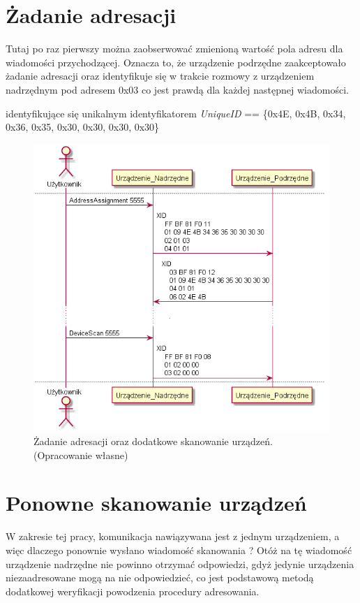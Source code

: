 \section{Żadanie adresacji}
Tutaj po raz pierwszy można zaobserwować zmienioną wartość pola adresu dla wiadomości
przychodzącej. Oznacza to, że urządzenie podrzędne zaakceptowało żadanie adresacji 
oraz identyfikuje się w trakcie rozmowy z urządzeniem nadrzędnym pod adresem 0x03 co
jest prawdą dla każdej następnej wiadomości.

identyfikujące się unikalnym identyfikatorem \textit{UniqueID} == \{0x4E, 0x4B, 0x34, 0x36, 0x35, 0x30, 0x30, 0x30, 0x30\}
\begin{figure}[h!]
    \centering
    \includegraphics[scale=0.75]{out/Diagramy/UML_DiagramOfSequence_New/UML_DiagramOfSequence_New-page2.png}
    \caption{Żadanie adresacji oraz dodatkowe skanowanie urządzeń.
        \newline(Opracowanie własne)}
    \label{fig:DiagramSequence_AddressAssignment_SecondDeviceScan}
\end{figure}
\section{Ponowne skanowanie urządzeń}
W zakresie tej pracy, komunikacja nawiązywana jest z jednym urządzeniem, a więc dlaczego
ponownie wysłano wiadomość skanowania ? Otóż na tę wiadomość urządzenie nadrzędne
nie powinno otrzymać odpowiedzi, gdyż jedynie urządzenia niezaadresowane mogą na nie 
odpowiedzieć, co jest podstawową metodą dodatkowej weryfikacji powodzenia procedury
adresowania.
